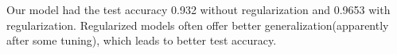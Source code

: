 \begin{answer}
Our model had the test accuracy 0.932 without regularization and 0.9653 with regularization. Regularized models often offer better generalization(apparently after some tuning), which leads to better test accuracy. \\
\end{answer}
   
  
